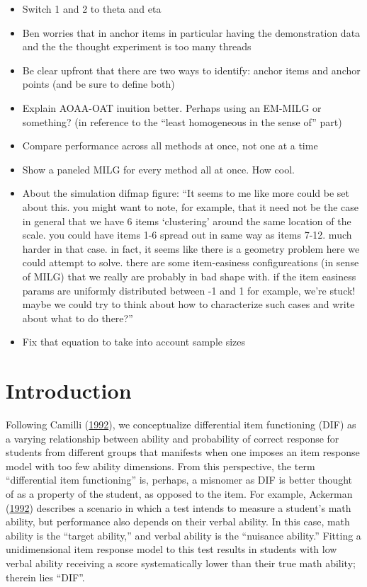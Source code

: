 \documentclass[
  11pt,
]{article}
\begin{document}
\begin{itemize}
\item
  Switch 1 and 2 to theta and eta
\item
  Ben worries that in anchor items in particular having the demonstration data and the the thought experiment is too many threads
\item
  Be clear upfront that there are two ways to identify: anchor items and anchor points (and be sure to define both)
\item
  Explain AOAA-OAT inuition better. Perhaps using an EM-MILG or something? (in reference to the \enquote{least homogeneous in the sense of} part)
\item
  Compare performance across all methods at once, not one at a time
\item
  Show a paneled MILG for every method all at once. How cool.
\item
  About the simulation difmap figure: \enquote{It seems to me like more could be set about this. you might want to note, for example, that it need not be the case in general that we have 6 items \enquote{clustering} around the same location of the scale. you could have items 1-6 spread out in same way as items 7-12. much harder in that case. in fact, it seems like there is a geometry problem here we could attempt to solve. there are some item-easiness configureations (in sense of MILG) that we really are probably in bad shape with. if the item easiness params are uniformly distributed between -1 and 1 for example, we're stuck! maybe we could try to think about how to characterize such cases and write about what to do there?}
\item
  Fix that equation to take into account sample sizes
\end{itemize}

\hypertarget{intro}{%
\section{Introduction}\label{intro}}

Following Camilli (\protect\hyperlink{ref-camilli1992conceptual}{1992}), we conceptualize differential item functioning (DIF) as a varying relationship between ability and probability of correct response for students from different groups that manifests when one imposes an item response model with too few ability dimensions. From this perspective, the term \enquote{differential item functioning} is, perhaps, a misnomer as DIF is better thought of as a property of the student, as opposed to the item. For example, Ackerman (\protect\hyperlink{ref-ackerman1992didactic}{1992}) describes a scenario in which a test intends to measure a student's math ability, but performance also depends on their verbal ability. In this case, math ability is the \enquote{target ability,} and verbal ability is the \enquote{nuisance ability.} Fitting a unidimensional item response model to this test results in students with low verbal ability receiving a score systematically lower than their true math ability; therein lies \enquote{DIF}.
\end{document}
